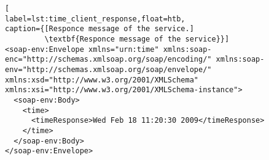 \begin{lstlisting}[
label=lst:time_client_response,float=htb,
caption={[Responce message of the service.]
         \textbf{Responce message of the service}}]
<soap-env:Envelope xmlns="urn:time" xmlns:soap-enc="http://schemas.xmlsoap.org/soap/encoding/" xmlns:soap-env="http://schemas.xmlsoap.org/soap/envelope/" xmlns:xsd="http://www.w3.org/2001/XMLSchema" xmlns:xsi="http://www.w3.org/2001/XMLSchema-instance">
  <soap-env:Body>
    <time>
      <timeResponse>Wed Feb 18 11:20:30 2009</timeResponse>
    </time>
  </soap-env:Body>
</soap-env:Envelope>
\end{lstlisting}


















